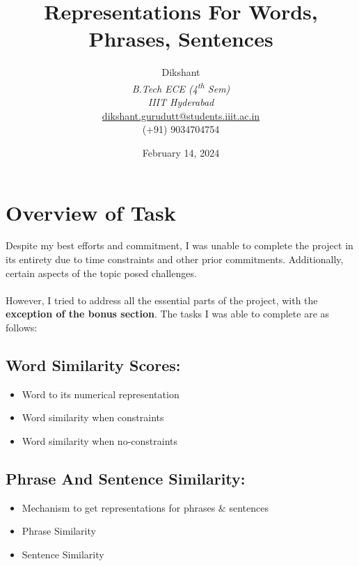 \documentclass{article}
\begin{document}
\title{Representations For Words, Phrases, Sentences}
\author{Dikshant\\ %
{\textit{B.Tech ECE (4\textsuperscript{th} Sem)}}\\
\textit{IIIT Hyderabad}\\
\href{mailto:dikshant.gurudutt@students.iiit.ac.in}{dikshant.gurudutt@students.iiit.ac.in}\\
(+91) 9034704754
}

\date{February 14, 2024}

\maketitle

\section*{Overview of Task}
Despite my best efforts and commitment, I was unable to complete the project in its entirety due to time constraints and other prior commitments. Additionally, certain aspects of the topic posed challenges.\\
\\
However, I tried to address all the essential parts of the project, with the \textbf{exception of the bonus section}. The tasks I was able to complete are as follows:

\subsection*{Word Similarity Scores:}
\begin{itemize}
\item Word to its numerical representation
\item Word similarity when constraints
\item Word similarity when no-constraints
\end{itemize}

\subsection*{Phrase And Sentence Similarity:}
\begin{itemize}
\item Mechanism to get representations for phrases \& sentences
\item Phrase Similarity
\item Sentence Similarity
\end{itemize}
\end{document}
